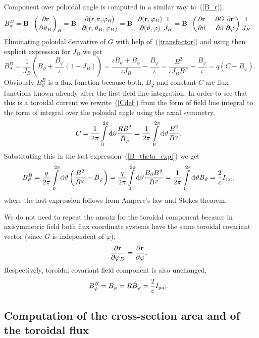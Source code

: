\documentclass[12pt]{article}
\newcommand{\be}[1]{\begin{equation} \label{#1}}
\newcommand{\ee}{\end{equation}}
\newcommand{\bea}[1]{\begin{eqnarray} \label{#1}}
\newcommand{\eea}{\end{eqnarray}}
\newcommand{\eq}[1]{(\ref{#1})}
\newcommand{\difp}[2]{\frac{\partial #1}{\partial #2}}
\newcommand{\br}{{\bf r}}
\newcommand{\bB}{{\bf B}}
\newcommand{\rd}{{\rm d}}
\begin{document}
\noindent
Component over poloidal angle is computed in a similar way to~\eq{B_r},
\be{B_theta}
B_\vartheta^B = \bB\cdot\left(\difp{\br}{\vartheta_B}\right)_B = \bB\cdot\difp{(r,\br,\varphi_B)}{(r,\vartheta_B,\varphi_B)}
= \bB\cdot\difp{(\br,\varphi_B)}{(\vartheta,\varphi)}\frac{1}{J_B}
= \bB\cdot\left(\difp{\br}{\vartheta}-\difp{G}{\vartheta}\difp{\br}{\varphi}\right)\frac{1}{J_B}.
\ee
Eliminating poloidal derivative of $G$ with help of~\eq{transfactor} and using then explicit expression for $J_B$ we get
\be{B_theta_expl}
B_\vartheta^B = \frac{1}{J_B}\left(B_\vartheta+\frac{B_\varphi}{\iota}\left(1-J_B\right)\right)
=\frac{\iota B_\vartheta+B_\varphi}{\iota J_B} - \frac{B_\varphi}{\iota}
=\frac{B^2}{\iota J_B B^\varphi} - \frac{B_\varphi}{\iota}
=q \left(C-B_\varphi\right).
\ee
Obviously $B_\vartheta^B$ is a flux function because both, $B_\varphi$ and constant $C$ are flux functions known already after the 
first field line integration. In order to see that this is a toroidal current we rewrite~\eq{Cdef} from the form of field line integral
to the form of integral over the poloidal angle using the axial symmetry,
\be{Cdef_pol}
C = \frac{1}{2\pi} \int\limits_0^{2\pi} \rd\vartheta \frac{R B^2}{\hat B_\varphi}
= \frac{1}{2\pi} \int\limits_0^{2\pi} \rd\vartheta \frac{B^2}{B^\varphi}.
\ee
Substituting this in the last expression~\eq{B_theta_expl} we get
\bea{torcurr}
B_\vartheta^B 
=\frac{q}{2\pi} \int\limits_0^{2\pi} \rd\vartheta \left(\frac{B^2}{B^\varphi}-B_\varphi\right)
=\frac{q}{2\pi} \int\limits_0^{2\pi} \rd\vartheta \frac{B_\vartheta B^\vartheta}{B^\varphi}
=\frac{1}{2\pi} \int\limits_0^{2\pi} \rd\vartheta B_\vartheta =\frac{2}{c} I_{\rm tor},
\eea
where the last expression follows from Ampere's law and Stokes theorem.

\noindent
We do not need to repeat the ansatz for the toroidal component because in axisymmetric field both flux coordinate systems
have the same toroidal covariant vector (since $G$ is independent of $\varphi$),
\be{bothsame}
\difp{\br}{\varphi_B}=\difp{\br}{\varphi}.
\ee
Respectively, toroidal covariant field component is also unchanged,
\be{B_phi}
B_\varphi^B = B_\varphi = R \hat B_\varphi=\frac{2}{c} I_{\rm pol}.
\ee

\subsection{Computation of the cross-section area and of the toroidal flux}
\label{ssec:oneDstuff}
\end{document}
